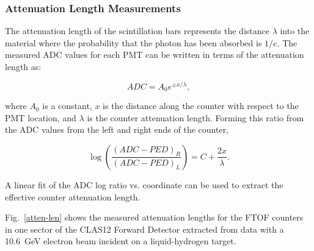 \documentclass{elsart}
\begin{document}
\subsubsection{Attenuation Length Measurements}
\label{sec:attlen}

The attenuation length of the scintillation bars represents the distance $\lambda$ into the material
where the probability that the photon has been absorbed is $1/e$. The measured ADC values for each
PMT can be written in terms of the attenuation length as:

\begin{equation}
\label{al-adc}
ADC = A_0 e^{\pm x/\lambda},
\end{equation}

\noindent
where $A_0$ is a constant, $x$ is the distance along the counter with respect to the PMT location, and
$\lambda$ is the counter attenuation length. Forming this ratio from the ADC values from the left and
right ends of the counter,

\begin{equation}
\label{linear}
\log \left( \frac{(ADC-PED)_R}{(ADC-PED)_L} \right ) = C + \frac{2x}{\lambda}.
\end{equation}

\noindent
A linear fit of the ADC log ratio vs. coordinate can be used to extract the effective counter attenuation
length. 

Fig.~\ref{atten-len} shows the measured attenuation lengths for the FTOF counters in one sector of
the CLAS12 Forward Detector extracted from data with a 10.6~GeV electron beam incident on a
liquid-hydrogen target.
\end{document}
